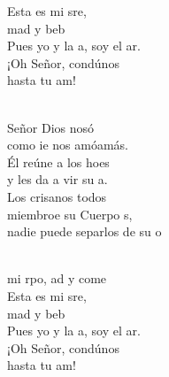 \begin{cancion}
\begin{chorus}
	Esta es mi sre,\\
	mad y beb\\
	Pues yo y la a, soy el ar.\\
	¡Oh Señor, condúnos \\
	hasta tu am!   \\
	\end{chorus}%
	\jump\\
	 Señor Dios nosó\\
	como ie nos amóamás.\\
	Él reúne a los hoes\\
	y les da a vir su a.\\
	Los crisanos todos \\
	miembroe su Cuerpo s,\\
	nadie puede separlos de su o \\\jump\\
	\begin{chorus}%
	 mi rpo, ad y come\\
	Esta es mi sre,\\
	mad y beb\\
	Pues yo y la a, soy el ar.\\
	¡Oh Señor, condúnos \\
	hasta tu am!   \\
	\end{chorus}%
	\jump\\
\end{cancion}%
